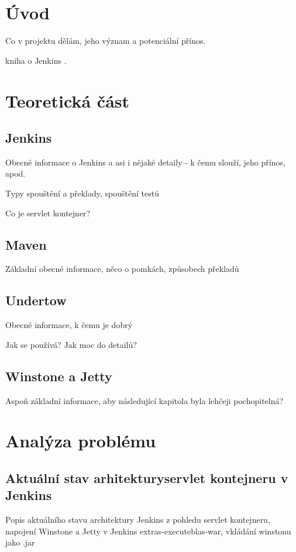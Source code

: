 



\chapter{Úvod}
    Co v projektu dělám, jeho význam a potenciální přínos.

    kniha o Jenkins \cite{JenkinsBook}.

\chapter{Teoretická část}
    \section {Jenkins}
        Obecné informace o Jenkins a asi i nějaké detaily - k čemu slouží, jeho přínos, apod.
        
        Typy spouštění a překlady, spouštění testů

        Co je servlet kontejner?

    \section{Maven}
        Základní obecné informace, něco o pomkách, způsobech překladů

    \section{Undertow}
        Obecné informace, k čemu je dobrý

        Jak se používá? Jak moc do detailů?

    \section{Winstone a Jetty}
        Aspoň základní informace, aby následující kapitola byla lehčeji pochopitelná?
        


\chapter{Analýza problému}
    
    \section{Aktuální stav arhitekturyservlet kontejneru v Jenkins}
        Popis aktuálního stavu architektury Jenkins z pohledu servlet kontejneru, napojení Winstone a Jetty v Jenkins
        extras-executeblas-war, vkládání winstonu jako .jar

